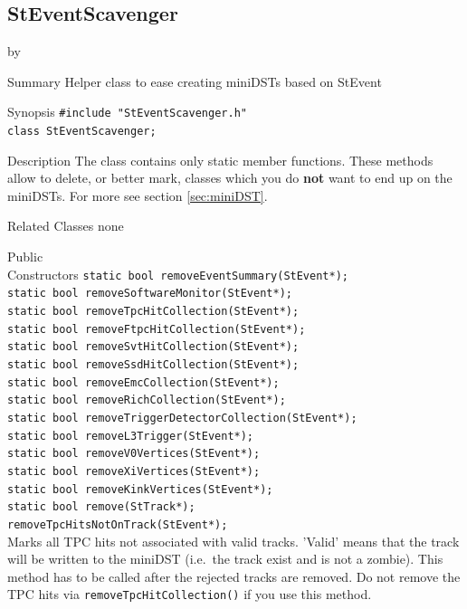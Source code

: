 \documentclass[twoside]{article}
\newcommand{\entrylabel}[1]{\mbox{\textbf{{#1}}}\hfil}%
\newenvironment{entry}
{\begin{list}{}%
    {\renewcommand{\makelabel}{\entrylabel}%
     \setlength{\labelwidth}{90pt}%
     \setlength{\leftmargin}{\labelwidth}
     \advance\leftmargin by \labelsep%
      }%
    }%
  {\end{list}}
\newcommand{\Entrylabel}[1]%
{\raisebox{0pt}[1ex][0pt]{\makebox[\labelwidth][l]%
    {\parbox[t]{\labelwidth}{\hspace{0pt}\textbf{{#1}}}}}}
\newenvironment{Entry}%
{\renewcommand{\entrylabel}{\Entrylabel}\begin{entry}}%
  {\end{entry}}
\begin{document}
\subsection{StEventScavenger}
\label{sec:StEventScavenger}
\begin{Entry}
\item[Summary] Helper class to ease creating miniDSTs based on StEvent
\item[Synopsis]
    \verb+#include "StEventScavenger.h"+\\
    \verb+class StEventScavenger;+\\
\item[Description]
    The class contains only static member functions. These
    methods allow to delete, or better mark, classes which
    you do \textbf{not} want to end up on the miniDSTs.
    For more see section \ref{sec:miniDST}.
\item[Related Classes]
    none
\item[Public\\ Constructors]
    \verb+static bool removeEventSummary(StEvent*);+\\
    \verb+static bool removeSoftwareMonitor(StEvent*);+\\
    \verb+static bool removeTpcHitCollection(StEvent*);+\\
    \verb+static bool removeFtpcHitCollection(StEvent*);+\\
    \verb+static bool removeSvtHitCollection(StEvent*);+\\
    \verb+static bool removeSsdHitCollection(StEvent*);+\\
    \verb+static bool removeEmcCollection(StEvent*);+\\
    \verb+static bool removeRichCollection(StEvent*);+\\
    \verb+static bool removeTriggerDetectorCollection(StEvent*);+\\
    \verb+static bool removeL3Trigger(StEvent*);+\\
    \verb+static bool removeV0Vertices(StEvent*);+\\
    \verb+static bool removeXiVertices(StEvent*);+\\
    \verb+static bool removeKinkVertices(StEvent*);+\\
    \verb+static bool remove(StTrack*);+\\
    
    \verb+removeTpcHitsNotOnTrack(StEvent*);+\\
    Marks all TPC hits not associated with valid tracks.
    'Valid' means that the track will be written to the miniDST
    (i.e.~the track exist and is not a zombie). This method
    has to be called after the rejected tracks are removed.
    Do not remove the TPC hits via \texttt{removeTpcHitCollection()}
    if you use this method.
\end{Entry}
\clearpage
\end{document}
